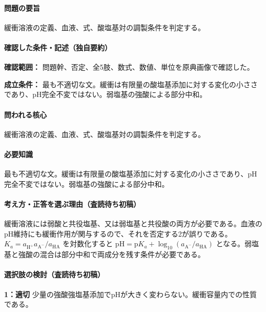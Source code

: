 \paragraph{問題の要旨} 緩衝溶液の定義、血液、式、酸塩基対の調製条件を判定する。

\paragraph{確認した条件・記述（独自要約）}\mbox{}\par

\noindent\textbf{確認範囲：} 問題幹、否定、全5肢、数式、数値、単位を原典画像で確認した。\par

\noindent\textbf{成立条件：} 最も不適切な文。緩衝は有限量の酸塩基添加に対する変化の小ささであり、pH完全不変ではない。弱塩基の強酸による部分中和。\par

\paragraph{問われる核心} 緩衝溶液の定義、血液、式、酸塩基対の調製条件を判定する。

\paragraph{必要知識} 最も不適切な文。緩衝は有限量の酸塩基添加に対する変化の小ささであり、pH完全不変ではない。弱塩基の強酸による部分中和。

\paragraph{考え方・正答を選ぶ理由（査読待ち初稿）} 緩衝溶液には弱酸と共役塩基、又は弱塩基と共役酸の両方が必要である。血液のpH維持にも緩衝作用が関与するので、それを否定する2が誤りである。\(K_a=a_{\mathrm{H^+}}a_{\mathrm{A^-}}/a_{\mathrm{HA}}\) を対数化すると \(\mathrm{pH=p}K_a+\log_{10}(a_{\mathrm{A^-}}/a_{\mathrm{HA}})\) となる。弱塩基と強酸の混合は部分中和で両成分を残す条件が必要である。

\paragraph{選択肢の検討（査読待ち初稿）}\mbox{}\par

\noindent\textbf{1：適切} 少量の強酸強塩基添加でpHが大きく変わらない。緩衝容量内での性質である。\par

